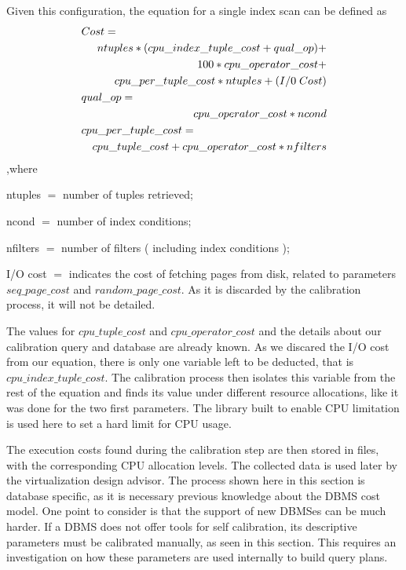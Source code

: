 Given this configuration, the equation for a single index scan can be defined as
\begin{eqnarray*}
  \lefteqn{Cost=} \\
  &&ntuples * ( cpu\_index\_tuple\_cost + qual\_op ) + \\
  &&100*cpu\_operator\_cost + \\
  &&cpu\_per\_tuple\_cost * ntuples + ( I/0\;Cost ) \\
  \lefteqn{qual\_op=} \\
  &&cpu\_operator\_cost * ncond \\
  \lefteqn{cpu\_per\_tuple\_cost=} \\
  &&cpu\_tuple\_cost + cpu\_operator\_cost * nfilters
\end{eqnarray*}
,where
\begin{description}
 \item ntuples $=$ number of tuples retrieved;
 \item ncond $=$ number of index conditions;
 \item nfilters $=$ number of filters ( including index conditions );
 \item I/O cost $=$ indicates the cost of fetching pages from disk, related to parameters $seq\_page\_cost$ and $random\_page\_cost$. As it is discarded by the calibration process, it will not be detailed.
\end{description}

The values for $cpu\_tuple\_cost$ and $cpu\_operator\_cost$ and the details about our calibration query and database are already known. As we discared the I/O cost from our equation, there is only one variable left to be deducted, that is $cpu\_index\_tuple\_cost$. The calibration process then isolates this variable from the rest of the equation and finds its value under different resource allocations, like it was done for the two first parameters. The library built to enable CPU limitation is used here to set a hard limit for CPU usage.

The execution costs found during the calibration step are then stored in files, with the corresponding CPU allocation levels. The collected data is used later by the virtualization design advisor. The process shown here in this section is database specific, as it is necessary previous knowledge about the DBMS cost model. One point to consider is that the support of new DBMSes can be much harder. If a DBMS does not offer tools for self calibration, its descriptive parameters must be calibrated manually, as seen in this section. This requires an investigation on how these parameters are used internally to build query plans.

